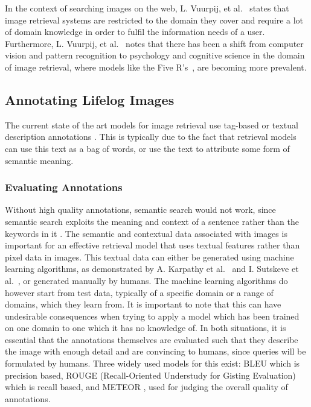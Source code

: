 \documentclass[12pt,a4paper]{article}
\begin{document}
In the context of searching images on the web,  L. Vuurpij, et al.~\cite{vuurpij2002vind} states that image retrieval systems are restricted to the domain they cover and require a lot of domain knowledge in order to fulfil the information needs of a user. Furthermore, L. Vuurpij, et al.~\cite{vuurpij2002vind} notes that there has been a shift from computer vision and pattern recognition to psychology and cognitive science in the domain of image retrieval, where models like the Five R's~\cite{gurrin2014lifelogging}, are becoming more prevalent. 

\subsection{Annotating Lifelog Images}
The current state of the art models for image retrieval use tag-based or textual description annotations \citep{ali2010semantically}. This is typically due to the fact that retrieval models can use this text as a bag of words, or use the text to attribute some form of semantic meaning.

\subsubsection{Evaluating Annotations}
Without high quality annotations, semantic search would not work, since semantic search exploits the meaning and context of a sentence rather than the keywords in it \cite{ali2010semantically}. The semantic and contextual data associated with images is important for an effective retrieval model that uses textual features rather than pixel data in images. This textual data can either be generated using machine learning algorithms, as demonstrated by A. Karpathy et al.~\cite{karpathy2015deep} and  I. Sutskeve et al.~\cite{sutskever2011generating}, or generated manually by humans. The machine learning algorithms do however start from test data, typically of a specific domain or a range of domains, which they learn from. It is important to note that this can have undesirable consequences when trying to apply a model which has been trained on one domain to one which it has no knowledge of. In both situations, it is essential that the annotations themselves are evaluated such that they describe the image with enough detail and are convincing to humans, since queries will be formulated by humans. Three widely used models for this exist: BLEU \citep{papineni2002bleu} which is precision based, ROUGE (Recall-Oriented Understudy for Gisting Evaluation) \citep{lin2004rouge} which is recall based, and METEOR \citep{elliott2013image}, used for judging the overall quality of annotations.
\end{document}

